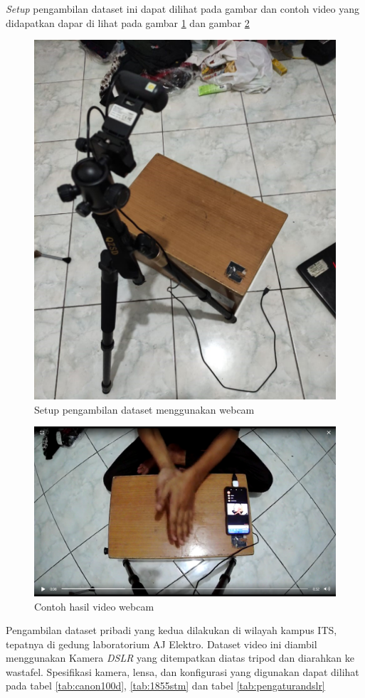 \textit{Setup} pengambilan dataset ini dapat dilihat pada gambar dan contoh video yang didapatkan dapar di lihat pada gambar \ref{fig:webcam2} dan gambar \ref{fig:contohwebcam}

\begin{figure}[!ht]
	\centering
	\includegraphics[width=0.67\columnwidth]{gambar/webcam2.jpeg}
	\caption{Setup pengambilan dataset menggunakan webcam}
	\label{fig:webcam2}
\end{figure}

\begin{figure}[!ht]
	\centering
	\includegraphics[width=0.85\columnwidth]{gambar/contohwebcam1.png}
	\caption{Contoh hasil video webcam}
	\label{fig:contohwebcam}
\end{figure}

Pengambilan dataset pribadi yang kedua dilakukan di wilayah kampus ITS, tepatnya di gedung laboratorium AJ Elektro. Dataset video ini diambil menggunakan Kamera \textit{DSLR} yang ditempatkan diatas tripod dan diarahkan ke wastafel. Spesifikasi kamera, lensa, dan konfigurasi yang digunakan dapat dilihat pada tabel \ref{tab:canon100d}, \ref{tab:1855stm} dan tabel \ref{tab:pengaturandslr}

